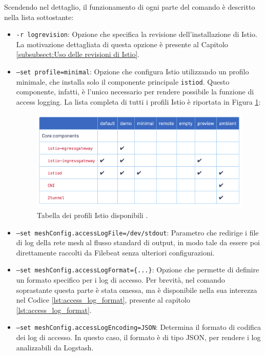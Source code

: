 Scendendo nel dettaglio, il funzionamento di ogni parte del comando è descritto nella lista sottostante:
\begin{itemize}

\item \texttt{-r logrevision}: Opzione che specifica la revisione dell'installazione di Istio. La motivazione dettagliata di questa opzione è presente al Capitolo \ref{subsubsect:Uso delle revisioni di Istio}.

\item \texttt{--set profile=minimal}: Opzione che configura Istio utilizzando un profilo minimale, che installa solo il componente principale \verb|istiod|. Questo componente, infatti, è l'unico necessario per rendere possibile la funzione di access logging.
La lista completa di tutti i profili Istio è riportata in Figura \ref{fig:istio_profiles}:
\begin{figure}[h]
    \centering
    \includegraphics[width=1\linewidth]{immagini/capitolo4/istio_profiles.png}
    \caption{Tabella dei profili Istio disponibili \cite{istio_profiles}.}
    \label{fig:istio_profiles}
\end{figure}

\item \texttt{--set meshConfig.accessLogFile=/dev/stdout}: Parametro che redirige i file di log della rete mesh al flusso standard di output, in modo tale da essere poi direttamente raccolti da Filebeat senza ulteriori configurazioni.

\item \texttt{--set meshConfig.accessLogFormat=\{...\}}: Opzione che permette di definire un formato specifico per i log di accesso. Per brevità, nel comando soprastante questa parte è stata omessa, ma è disponibile nella sua interezza nel Codice \ref{lst:access_log_format}, presente al capitolo \ref{lst:access_log_format}.


\item \texttt{--set meshConfig.accessLogEncoding=JSON}: Determina il formato di codifica dei log di accesso. In questo caso, il formato è di tipo JSON, per rendere i log analizzabili da Logstash.


\end{itemize}
